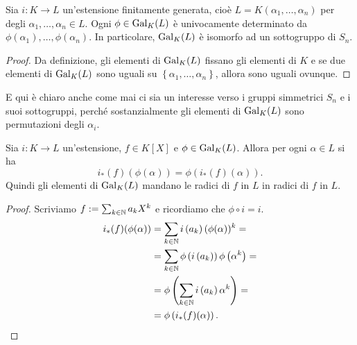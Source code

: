 \begin{prop}
Sia \(i : K \to L\) un'estensione finitamente generata, cioè \(L = K\left(\alpha_1, \dots{}, \alpha_n\right)\) per degli \(\alpha_1, \dots{}, \alpha_n \in L\). Ogni \(\phi \in \Gal[K]{L}\) è univocamente determinato da \(\phi\left(\alpha_1\right), \dots{}, \phi\left(\alpha_n\right)\). In particolare, \(\Gal[K]{L}\) è isomorfo ad un sottogruppo di \(S_n\).
\end{prop}

\begin{proof}
Da definizione, gli elementi di \(\Gal[K]{L}\) fissano gli elementi di \(K\) e se due elementi di \(\Gal[K]{L}\) sono uguali su \(\left\{\alpha_1, \dots{}, \alpha_n\right\}\), allora sono uguali ovunque.
\end{proof}


E qui è chiaro anche come mai ci sia un interesse verso i gruppi simmetrici \(S_n\) e i suoi sottogruppi, perché sostanzialmente gli elementi di \(\Gal[K]{L}\) sono permutazioni degli \(\alpha_i\).

\begin{prop}
Sia \(i : K \to L\) un'estensione, \(f \in K[X]\) e \(\phi \in \Gal[K]{L}\). Allora per ogni \(\alpha \in L\) si ha
\[i_\ast(f)(\phi(\alpha)) = \phi\left(i_\ast(f)(\alpha)\right) .\]
Quindi gli elementi di \(\Gal[K]L\) mandano le radici di \(f\) in \(L\) in radici di \(f\) in \(L\). %
\end{prop}

\begin{proof}
Scriviamo \(f := \sum_{k \in \N} a_k X^k\) e ricordiamo che \(\phi \circ i = i\).
\begin{align*}
i_\ast (f) (\phi(\alpha)) &= \sum_{k \in \N} i\left(a_k\right) (\phi(\alpha))^k = \\
                          &= \sum_{k \in \N} \phi\left(i\left(a_k\right)\right) \phi\left(\alpha^k\right) = \\
                          &= \phi\left( \sum_{k \in \N} i\left(a_k\right) \alpha^k \right) = \\
                          &= \phi\left(i_\ast(f)(\alpha)\right) .\qedhere
\end{align*}
\end{proof}

